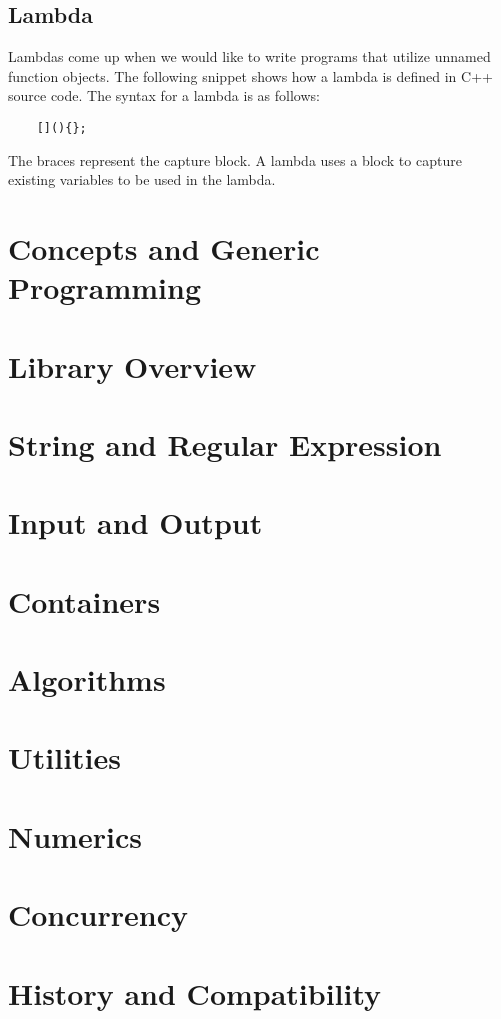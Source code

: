 \documentclass{article}
\begin{document}
\subsection{Lambda}
Lambdas come up when we would like to write programs that utilize unnamed function objects. The following snippet shows how a lambda is defined in C++ source code. The syntax for a lambda is as follows:
\begin{verbatim}
	[](){};
\end{verbatim}
The braces represent the capture block. A lambda uses a block to capture existing variables to be used in the lambda. 
\section{Concepts and Generic Programming}

\section{Library Overview}

\section{String and Regular Expression}

\section{Input and Output}

\section{Containers}

\section{Algorithms}

\section{Utilities}

\section{Numerics}

\section{Concurrency}

\section{History and Compatibility}
\end{document}
